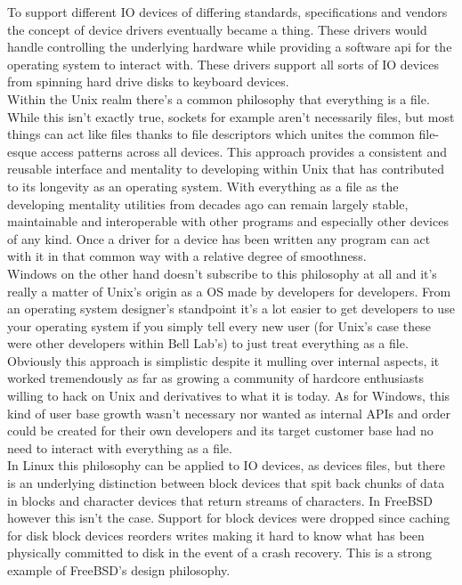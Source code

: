 \documentclass[letterpaper,10pt,draftclsnofoot,onecolumn]{IEEEtran}
\begin{document}
To support different IO devices of differing standards, specifications and vendors the concept of device drivers eventually became a thing. These drivers would handle controlling the underlying hardware while providing a software api for the operating system to interact with. These drivers support all sorts of IO devices from spinning hard drive disks to keyboard devices.\\

Within the Unix realm there’s a common philosophy \cite{love} that everything is a file. While this isn’t exactly true, sockets for example aren’t necessarily files, but most things can act like files thanks to file descriptors which unites the common file-esque access patterns across all devices. This approach provides a consistent and reusable interface and mentality to developing within Unix that has contributed to its longevity as an operating system. With everything as a file as the developing mentality utilities from decades ago can remain largely stable, maintainable and interoperable with other programs and especially other devices of any kind. Once a driver for a device has been written any program can act with it in that common way with a relative degree of smoothness.\\

Windows on the other hand doesn’t subscribe to this philosophy at all and it’s really a matter of Unix’s origin as a OS made by developers for developers. From an operating system designer’s standpoint it’s a lot easier to get developers to use your operating system if you simply tell every new user (for Unix’s case these were other developers within Bell Lab’s) to just treat everything as a file. Obviously this approach is simplistic despite it mulling over internal aspects, it worked tremendously as far as growing a community of hardcore enthusiasts willing to hack on Unix and derivatives to what it is today. As for Windows, this kind of user base growth wasn’t necessary nor wanted as internal APIs and order could be created for their own developers and its target customer base had no need to interact with everything as a file.\\

In Linux this philosophy can be applied to IO devices, as devices files, but there is an underlying distinction between block devices that spit back chunks of data in blocks and character devices that return streams of characters. In FreeBSD however this isn’t the case. \cite{freebsdarch} Support for block devices were dropped since caching for disk block devices reorders writes making it hard to know what has been physically committed to disk in the event of a crash recovery. This is a strong example of FreeBSD’s design philosophy.\\
\end{document}
